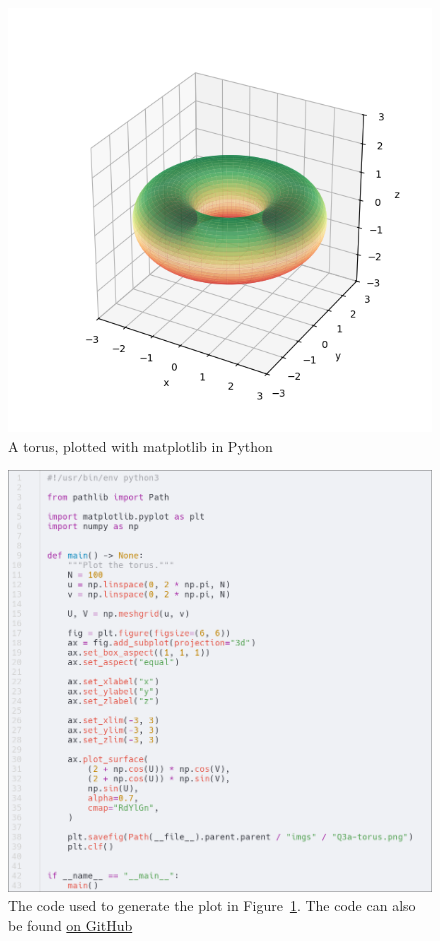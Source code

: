\documentclass[a4paper]{article}
\begin{document}
\begin{figure}[h]
	\centering
	\includegraphics[scale=0.8]{Q3a-torus}
	\caption{A torus, plotted with matplotlib in Python}
	\label{fig:torus-plot}
\end{figure}

\begin{figure}[h]
	\centering
	\includegraphics[scale=0.35]{Q3a-code}
	\caption{The code used to generate the plot in Figure~\ref{fig:torus-plot}. The code can also be found \href{https://github.com/DoctorDalek1963/uni}{on GitHub}}
\end{figure}
\end{document}
